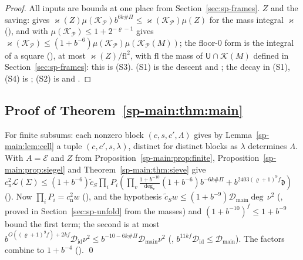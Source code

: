 \begin{proof}
All inputs are bounds at one place from Section~\ref{sec:sp-frames}. $Z$ and the saving:
 gives
$\varkappa(Z)\mu(\mathcal K_{\mathcal P})b^{6k\#\Pi}\le\varkappa(\mathcal K_{\mathcal P})\mu(Z)$ for
the mass integral $\varkappa$ (), and
 with
$\mu(\mathcal K_{\mathcal P})\le1+2^{-\varrho-1}$ gives
$\varkappa(\mathcal K_{\mathcal P})\le(1+b^{-6})\mu(\mathcal K_{\mathcal P})\mu(\mathcal K_{\mathcal P}(M))$; the floor-$0$
form is the integral of a square (), at most
$\varkappa(Z)/\mathrm{fl}^2$, with $\mathrm{fl}$ the mass of $\mathsf U\cap\mathcal K(M)$ defined in
Section~\ref{sec:sp-frames}: this is (S3). (S1) is the descent
 and
; the decay in (S1), (S4)
is ; (S2) is
 and
.
\end{proof}

\subsection{Proof of Theorem~\ref{sp-main:thm:main}}\label{sp-main:ss:proof}

For finite subsums: each nonzero block $(c,s,c',\Lambda)$ gives by Lemma~\ref{sp-main:lem:cell} a
tuple $(c,c',s,\lambda)$, distinct for distinct blocks as $\lambda$ determines $\Lambda$. With
$A=\mathcal E$ and $Z$ from Proposition~\ref{sp-main:prop:finite}, Proposition~\ref{sp-main:prop:siegel}
and Theorem~\ref{sp-main:thm:sieve} give $c_{\mathrm n}^2\mathcal L(\Sigma)\le(1+b^{-6})\tilde c_S\prod_iP_i(\prod_v
\frac{1+b^{-10}}{\deg_v}(1+b^{-6})b^{-6k\#\Pi}+b^{2403(\varrho+1)^9f}\mathfrak d)$
(). Now $\prod_iP_i=c_{\mathrm n}^2w$
(), and the hypothesis $\tilde c_Sw\le(1+b^{-9})\mathcal
D_{\mathrm{main}}\deg\,\nu^2$ (, proved in
Section~\ref{sec:sp-unfold} from the masses) and $(1+b^{-10})^f\le1+b^{-9}$ bound the first
term; the second is at most $b^{O((\varrho+1)^9f)+2kf}\mathcal D_{\mathrm{id}}\nu^2\le
b^{-10-6k\#\Pi}\mathcal D_{\mathrm{main}}\nu^2$ (,
$b^{11kf}\mathcal D_{\mathrm{id}}\le\mathcal D_{\mathrm{main}}$). The factors combine to $1+b^{-4}$
(). \qed

